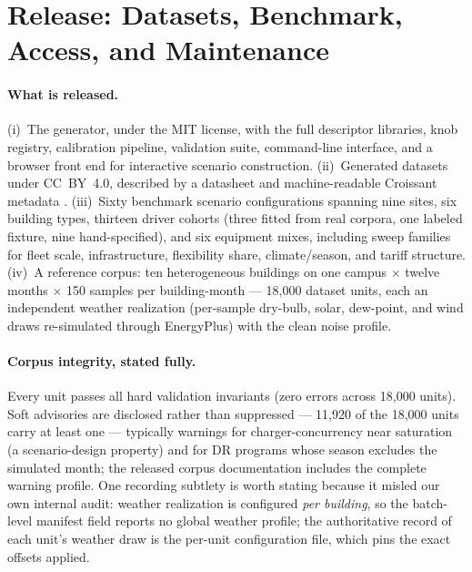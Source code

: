 \section{Release: Datasets, Benchmark, Access, and Maintenance}
\label{sec:release}

\paragraph{What is released.}
(i)~The generator, under the MIT license, with the full descriptor libraries,
knob registry, calibration pipeline, validation suite, command-line interface,
and a browser front end for interactive scenario construction. (ii)~Generated
datasets under CC~BY~4.0, described by a datasheet
\citep{gebru2021datasheets} and machine-readable Croissant metadata
\citep{akhtar2024croissant}. (iii)~Sixty benchmark scenario configurations
spanning nine sites, six building types, thirteen driver cohorts (three
fitted from real corpora, one labeled fixture, nine hand-specified), and six
equipment mixes, including sweep families for fleet scale, infrastructure,
flexibility share, climate/season, and tariff structure. (iv)~A reference
corpus: ten heterogeneous buildings on one campus $\times$ twelve months
$\times$ 150 samples per building-month --- 18{,}000 dataset units, each an
independent weather realization (per-sample dry-bulb, solar, dew-point, and
wind draws re-simulated through EnergyPlus) with the clean noise profile.

\paragraph{Corpus integrity, stated fully.}
Every unit passes all hard validation invariants (zero errors across 18{,}000
units). Soft advisories are disclosed rather than suppressed --- 11{,}920 of
the 18{,}000 units carry at least one --- typically warnings for charger-concurrency near saturation (a scenario-design property)
and for DR programs whose season excludes the simulated month; the released
corpus documentation includes the complete warning profile. One recording
subtlety is worth stating because it misled our own internal audit: weather
realization is configured \emph{per building}, so the batch-level manifest
field reports no global weather profile; the authoritative record of each
unit's weather draw is the per-unit configuration file, which pins the exact
offsets applied.

